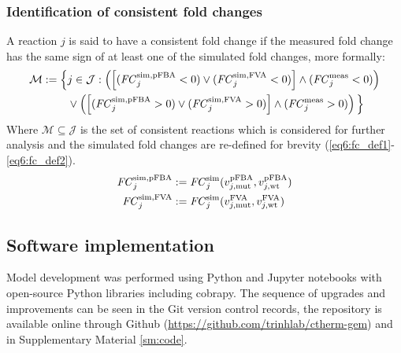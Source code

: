\subsubsection{Identification of consistent fold changes}
A reaction $j$ is said to have a consistent fold change if the measured fold change has the same sign of at least one of the simulated fold changes, more formally:
\begin{equation} \label{eq6:cons}
    \begin{aligned}
        \mathcal{M} := \Big\{ & j\in\mathcal{J}: \left( \left[ (\mathit{FC}_j^{\mathrm{sim},\mathrm{pFBA}}<0) \lor (\mathit{FC}_j^{\mathrm{sim},\mathrm{FVA}}<0) \right] \land (\mathit{FC}_j^{\mathrm{meas}}<0) \right) \\
        & \lor \left( \left[ (\mathit{FC}_j^{\mathrm{sim},\mathrm{pFBA}}>0) \lor (\mathit{FC}_j^{\mathrm{sim},\mathrm{FVA}}>0) \right] \land (\mathit{FC}_j^{\mathrm{meas}}>0) \right) \Big\}
    \end{aligned}
\end{equation}
Where $\mathcal{M} \subseteq \mathcal{J}$ is the set of consistent reactions which is considered for further analysis and the simulated fold changes are re-defined for brevity (\ref{eq6:fc_def1}-\ref{eq6:fc_def2}).
\begin{alignat}{3}
    \mathit{FC}_j^{\mathrm{sim},\mathrm{pFBA}} &:= \mathit{FC}_j^{\mathrm{sim}} (v_{j,\text{mut}}^{\mathrm{pFBA}}, v_{j,\text{wt}}^{\mathrm{pFBA}}) \label{eq6:fc_def1}\\
    \mathit{FC}_j^{\mathrm{sim},\mathrm{FVA}} &:= \mathit{FC}_j^{\mathrm{sim}} (v_{j,\text{mut}}^{\mathrm{FVA}}, v_{j,\text{wt}}^{\mathrm{FVA}}) \label{eq6:fc_def2}
\end{alignat}


\subsection{Software implementation}
Model development was performed using Python and Jupyter notebooks with open-source Python libraries including cobrapy.\citep{ebrahim2013}
The sequence of upgrades and improvements can be seen in the Git version
control records, the repository is available online through Github (\url{https://github.com/trinhlab/ctherm-gem}) and in Supplementary Material \ref{sm:code}.

